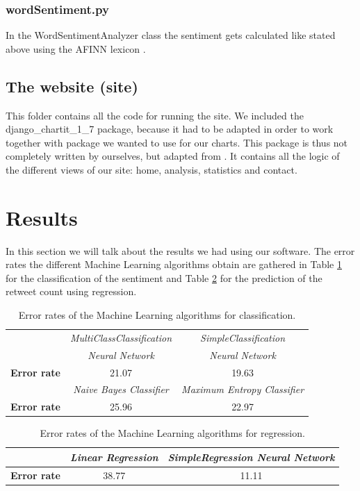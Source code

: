 \documentclass[10pt]{IEEEtran}
\begin{document}
\subsubsection{wordSentiment.py}

In the WordSentimentAnalyzer class the sentiment gets calculated like stated above using the AFINN lexicon \cite{AFINN}. 

\subsection{The website (site)}

This folder contains all the code for running the site. We included the django\_chartit\_1\_7 package, because it had to be adapted in order to work together with package we wanted to use for our charts. This package is thus not completely written by ourselves, but adapted from \cite{django}. It contains all the logic of the different views of our site: home, analysis, statistics and contact. 

\section{Results}

In this section we will talk about the results we had using our software. The error rates the different Machine Learning algorithms obtain are gathered in Table \ref{tableclassification} for the classification of the sentiment and Table \ref{tableregression} for the prediction of the retweet count using regression. 

\begin{table}[h!]
	\centering
		\begin{tabular}{ | >{\bfseries}l || c | c |}
		\hline
		& \emph{MultiClassClassification} & \emph{SimpleClassification} \\ 
		& \emph{Neural Network} & \emph{Neural Network} \\
		\hline
		\hline
		Error rate & 21.07 & 19.63 \\ 
		\hline  
		&  \emph{Naive Bayes Classifier} &  \emph{Maximum Entropy Classifier} \\
		\hline
		\hline
		Error rate &  25.96 & 22.97 \\
		\hline
		\end{tabular}
    \caption{Error rates of the Machine Learning algorithms for classification.}
    \label{tableclassification}
\end{table} 

\begin{table}[h]
	\centering
		\begin{tabular}{ | >{\bfseries}l || c | c |}
		\hline
		&  \emph{Linear Regression} & \emph{SimpleRegression Neural Network} \\ 
		\hline
		\hline
		Error rate & 38.77 & 11.11 \\ 
		\hline  
		\end{tabular}
    \caption{Error rates of the Machine Learning algorithms for regression.}
    \label{tableregression}
\end{table} 
\end{document}
